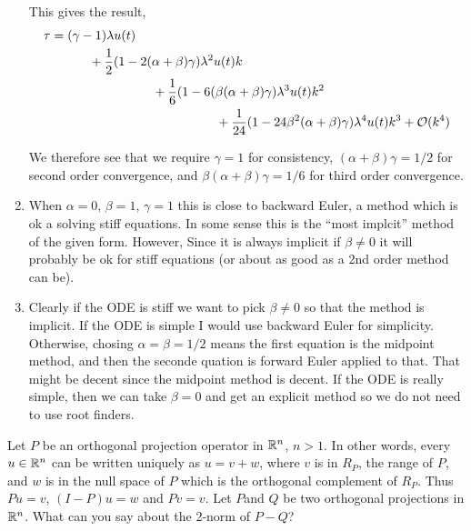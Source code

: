 \documentclass[10pt]{article}
\begin{document}
\begin{solution}[Solution]
\begin{enumerate}[label=(\alph*)]
		This gives the result,
        \begin{align*}
            \tau &= (\gamma-1) \lambda u(t) 
            \\ & \hspace{3em}+ \frac{1}{2}(1-2(\alpha + \beta)\gamma) \lambda^2 u(t) k 
            \\ & \hspace{8em}+ \frac{1}{6}(1-6(\beta(\alpha+\beta)\gamma)\lambda^3u(t) k^2 
            \\ & \hspace{13em} + \frac{1}{24}(1-24 \beta^2(\alpha+\beta)\gamma)\lambda^4u(t)k^3+ \cO(k^4)
        \end{align*}
       
        We therefore see that we require \( \gamma = 1 \) for consistency, \( (\alpha+\beta)\gamma = 1/2 \) for second order convergence, and \( \beta(\alpha + \beta)\gamma = 1/6 \) for third order convergence.
        

    \item When \( \alpha=0 \), \( \beta = 1 \), \( \gamma=1 \) this is close to backward Euler, a method which is ok a solving stiff equations. In some sense this is the ``most implcit'' method of the given form. However, Since it is always implicit  if \( \beta \neq 0 \) it will probably be ok for stiff equations (or about as good as a 2nd order method can be).

    \item Clearly if the ODE is stiff we want to pick \( \beta \neq 0 \) so that the method is implicit. If the ODE is simple I would use backward Euler for simplicity. Otherwise, chosing \( \alpha = \beta = 1/2 \) means the first equation is the midpoint method, and then the seconde quation is forward Euler applied to that. That might be decent since the midpoint method is decent. If the ODE is really simple, then we can take \( \beta = 0 \) and get an explicit method so we do not need to use root finders.
        
\end{enumerate}
\end{solution}

\begin{problem}
    Let \( P \) be an orthogonal projection operator in \( \mathbb{R}^n\), \( n > 1 \). In other words, every \( u\in \mathbb{R}^n \) can be written uniquely as \( u = v + w\), where \( v \) is in \( R_P \), the range of \( P \), and \( w \) is in the null space of \( P \) which is the orthogonal complement of \( R_P \). Thus \( Pu = v\), \( (I - P)u = w \) and \( Pv = v \). Let \( P \)and \( Q \) be two orthogonal projections in \( \mathbb{R}^n \). What can you say about the 2-norm of \( P - Q\)?
\end{problem}
\end{document}
